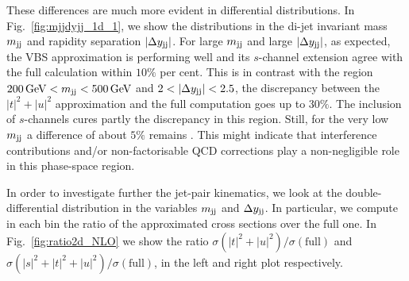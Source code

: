 These differences are much more evident in differential distributions.
In Fig.~\ref{fig:mjjdyjj_1d_1}, we show the distributions in the di-jet invariant mass $m_{\text{j}\text{j}}$ and rapidity separation $|\Delta y_{\text{j}\text{j}}|$.
For large $m_{\text{j}\text{j}}$ and large $|\Delta y_{\text{j}\text{j}}|$, as expected, the VBS approximation is performing well and its $s$-channel extension agree with the full calculation within $10\%$ per cent.
This is in contrast with the region  $200 \,\text{GeV} < m_{\text{j}\text{j}} < 500 \,\text{GeV}$ and $2<|\Delta y_{\Pj\Pj}|<2.5$, the discrepancy between the $|t|^2 + |u|^2$ approximation and the full computation goes up to $30\%$.
The inclusion of $s$-channels cures partly the discrepancy in this region.
Still, for the very low $m_{\text{j}\text{j}}$ a difference of about $5\%$ remains .
This might indicate that interference contributions and/or non-factorisable QCD corrections play a non-negligible role in this phase-space region.

In order to investigate further the jet-pair kinematics, we look at the double-differential distribution in the variables $m_{\text{j}\text{j}}$ and $\Delta y_{\text{j}\text{j}}$.
In particular, we compute in each bin the ratio of the approximated cross sections over the full one.
In Fig.~\ref{fig:ratio2d_NLO} we show the ratio $\sigma(|t|^2 + |u|^2)/\sigma(\textrm{full})$ and $\sigma(|s|^2+|t|^2 + |u|^2)/\sigma(\textrm{full})$, in the left and right plot respectively.


